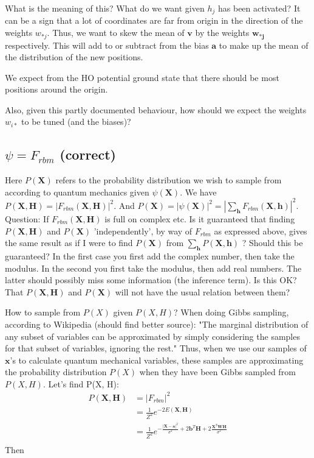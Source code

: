 \documentclass[norsk,a4paper,11pt]{article}
\newcommand{\VX}{\mathbf{X}}
\newcommand{\VH}{\mathbf{H}}
\newcommand{\Vh}{\mathbf{h}}
\newcommand{\VW}{\mathbf{W}}
\newcommand{\Va}{\mathbf{a}}
\newcommand{\Vb}{\mathbf{b}}
\begin{document}
What is the meaning of this? What do we want given $h_j$ has been activated? It can be a sign that a lot of coordinates are far from origin in the direction of the weights $w_{*j}$. Thus, we want to skew the mean of $\mathbf{v}$ by the weights $\mathbf{w_{*j}}$ respectively. This will add to or subtract from the bias $\mathbf{a}$ to make up the mean of the distribution of the new positions. 

We expect from the HO potential ground state that there should be most positions around the origin.

Also, given this partly documented behaviour, how should we expect the weights $w_{i*}$ to be tuned (and the biases)?

\color{Blue}
\subsection{$\psi = F_{rbm}$ (correct)}
\color{Black}
Here $P(\VX)$ refers to the probability distribution we wish to sample from according to quantum mechanics given $\psi (\VX)$. We have $P(\VX, \VH) = |F_{rbm}(\VX, \VH)|^2 $. And $P(\VX) = |\psi (\VX)|^2 = |\sum_\Vh F_{rbm}(\VX, \Vh)|^2$. Question: If $F_{rbm}(\VX, \VH)$ is full on complex etc. Is it guaranteed that finding $P(\VX, \VH)$ and $P(\VX) $ 'independently', by way of $F_{rbm}$ as expressed above, gives the same result as if I were to find $P(\VX)$ from $\sum_\Vh P(\VX, \Vh)$ ? Should this be guaranteed? In the first case you first add the complex number, then take the modulus. In the second you first take the modulus, then add real numbers. The latter should possibly miss some information (the inference term). Is this OK? That $P(\VX, \VH)$ and $P(\VX)$ will not have the usual relation between them?

How to sample from $P(X)$ given $P(X, H)$? When doing Gibbs sampling, according to Wikipedia (should find better source): "The marginal distribution of any subset of variables can be approximated by simply considering the samples for that subset of variables, ignoring the rest." Thus, when we use our samples of $\mathbf{x}$'s to calculate quantum mechanical variables, these samples are approximating the probability distribution $P(X)$ when they have been Gibbs sampled from $P(X, H)$. Let's find P(X, H):
\begin{align}
	P(\VX, \VH) &= |F_{rbm}|^2 \\
	&= \frac{1}{Z^2} e^{-2E(\VX, \VH)} \\
	&= \frac{1}{Z^2} e^{-\frac{|\VX - \Va|^2}{\sigma^2} + 2\Vb^T \VH + 2\frac{\VX^T \VW \VH}{\sigma^2}} \\
\end{align}
Then
\end{document}
